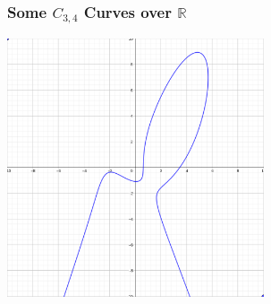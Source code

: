 \documentclass{beamer}
\let\div\undefined
\newcommand{\defn}{\textbf}
\newcommand{\bb}[1]{\mathbb{#1}}
\DeclareMathOperator{\Cl}{Cl}
\DeclareMathOperator{\div}{div}
\DeclareMathOperator{\Div}{Div}
\DeclareMathOperator{\Princ}{Princ}
\renewcommand{\bar}{\overline}
\begin{document}
\begin{frame}
\frametitle{Some $C_{3,4}$ Curves over $\bb R$}
  \begin{center} \includegraphics[height=7.6cm]{curve4.png} \end{center}
\end{frame}

\end{document}
